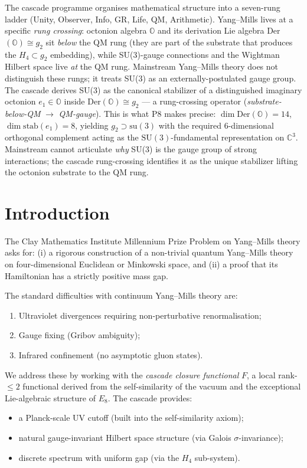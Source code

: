 \documentclass[11pt, a4paper]{amsart}
\theoremstyle{definition}
\begin{document}
The cascade programme organises mathematical structure into a
seven-rung ladder (Unity, Observer, Info, GR, Life, QM,
Arithmetic). Yang--Mills lives at a specific \emph{rung crossing}:
octonion algebra $\mathbb{O}$ and its derivation Lie algebra
Der$(\mathbb{O}) \cong g_2$ sit \emph{below} the QM rung (they are
part of the substrate that produces the $H_4 \subset g_2$ embedding),
while SU(3)-gauge connections and the Wightman Hilbert space live
\emph{at} the QM rung. Mainstream Yang--Mills theory does not
distinguish these rungs; it treats SU(3) as an externally-postulated
gauge group. The cascade derives SU(3) as the canonical stabilizer
of a distinguished imaginary octonion $e_1 \in \mathbb{O}$ inside
Der$(\mathbb{O}) \cong g_2$ — a rung-crossing operator
(\emph{substrate-below-QM} $\to$ \emph{QM-gauge}). This is what P8
makes precise: $\dim \mathrm{Der}(\mathbb{O}) = 14$,
$\dim \mathrm{stab}(e_1) = 8$, yielding $g_2 \supset \mathrm{su}(3)$
with the required 6-dimensional orthogonal complement acting as the
$\mathrm{SU}(3)$-fundamental representation on $\mathbb{C}^3$.
Mainstream cannot articulate \emph{why} SU(3) is the gauge group of
strong interactions; the cascade rung-crossing identifies it as the
unique stabilizer lifting the octonion substrate to the QM rung.

\section{Introduction}

The Clay Mathematics Institute Millennium Prize Problem on Yang--Mills
theory asks for: (i) a rigorous construction of a non-trivial quantum
Yang--Mills theory on four-dimensional Euclidean or Minkowski space,
and (ii) a proof that its Hamiltonian has a strictly positive mass gap.

The standard difficulties with continuum Yang--Mills theory are:
\begin{enumerate}
  \item Ultraviolet divergences requiring non-perturbative renormalisation;
  \item Gauge fixing (Gribov ambiguity);
  \item Infrared confinement (no asymptotic gluon states).
\end{enumerate}

We address these by working with the \emph{cascade closure functional} $F$,
a local rank-$\leq 2$ functional derived from the self-similarity of the
vacuum and the exceptional Lie-algebraic structure of $E_8$.
The cascade provides:
\begin{itemize}
  \item a Planck-scale UV cutoff (built into the self-similarity axiom);
  \item natural gauge-invariant Hilbert space structure
  (via Galois $\sigma$-invariance);
  \item discrete spectrum with uniform gap (via the $H_4$ sub-system).
\end{itemize}
\end{document}
